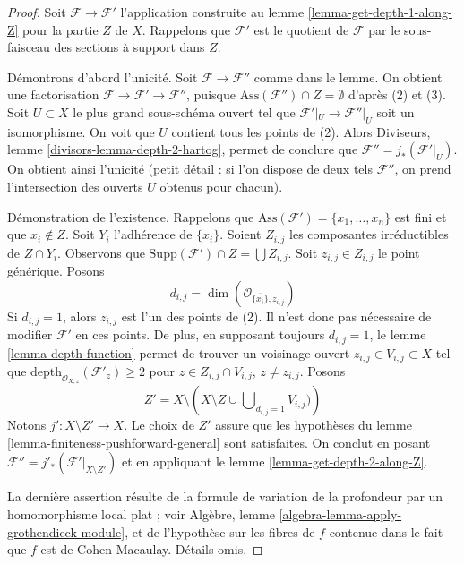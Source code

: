 \begin{proof}
Soit $\mathcal{F} \to \mathcal{F}'$ l'application construite au lemme \ref{lemma-get-depth-1-along-Z} pour la partie $Z$ de $X$. Rappelons que $\mathcal{F}'$ est le quotient de $\mathcal{F}$ par le sous-faisceau des sections à support dans $Z$.

\medskip\noindent
Démontrons d'abord l'unicité. Soit $\mathcal{F} \to \mathcal{F}''$ comme dans le lemme. On obtient une factorisation $\mathcal{F} \to \mathcal{F}' \to \mathcal{F}''$, puisque $\text{Ass}(\mathcal{F}'') \cap Z = \emptyset$ d'après (2) et (3). Soit $U \subset X$ le plus grand sous-schéma ouvert tel que $\mathcal{F}'|_U \to \mathcal{F}''|_U$ soit un isomorphisme. On voit que $U$ contient tous les points de (2). Alors Diviseurs, lemme \ref{divisors-lemma-depth-2-hartog}, permet de conclure que $\mathcal{F}'' = j_*(\mathcal{F}'|_U)$. On obtient ainsi l'unicité (petit détail : si l'on dispose de deux tels $\mathcal{F}''$, on prend l'intersection des ouverts $U$ obtenus pour chacun).

\medskip\noindent
Démonstration de l'existence. Rappelons que $\text{Ass}(\mathcal{F}') = \{x_1, \ldots, x_n\}$ est fini et que $x_i \not \in Z$. Soit $Y_i$ l'adhérence de $\{x_i\}$. Soient $Z_{i, j}$ les composantes irréductibles de $Z \cap Y_i$. Observons que $\text{Supp}(\mathcal{F}') \cap Z = \bigcup Z_{i, j}$. Soit $z_{i, j} \in Z_{i, j}$ le point générique. Posons
$$
d_{i, j} = \dim(\mathcal{O}_{\overline{\{x_i\}}, z_{i, j}})
$$
Si $d_{i, j} = 1$, alors $z_{i, j}$ est l'un des points de (2). Il n'est donc pas nécessaire de modifier $\mathcal{F}'$ en ces points. De plus, en supposant toujours $d_{i, j} = 1$, le lemme \ref{lemma-depth-function} permet de trouver un voisinage ouvert $z_{i, j} \in V_{i, j} \subset X$ tel que $\text{depth}_{\mathcal{O}_{X, z}}(\mathcal{F}'_z) \geq 2$ pour $z \in Z_{i, j} \cap V_{i, j}$, $z \not = z_{i, j}$. Posons
$$
Z' = X \setminus
\left(
X \setminus Z \cup \bigcup\nolimits_{d_{i, j} = 1} V_{i, j})
\right)
$$
Notons $j' : X \setminus Z' \to X$. Le choix de $Z'$ assure que les hypothèses du lemme \ref{lemma-finiteness-pushforward-general} sont satisfaites. On conclut en posant $\mathcal{F}'' = j'_*(\mathcal{F}'|_{X \setminus Z'})$ et en appliquant le lemme \ref{lemma-get-depth-2-along-Z}.

\medskip\noindent
La dernière assertion résulte de la formule de variation de la profondeur par un homomorphisme local plat ; voir Algèbre, lemme \ref{algebra-lemma-apply-grothendieck-module}, et de l'hypothèse sur les fibres de $f$ contenue dans le fait que $f$ est de Cohen-Macaulay. Détails omis.
\end{proof}

